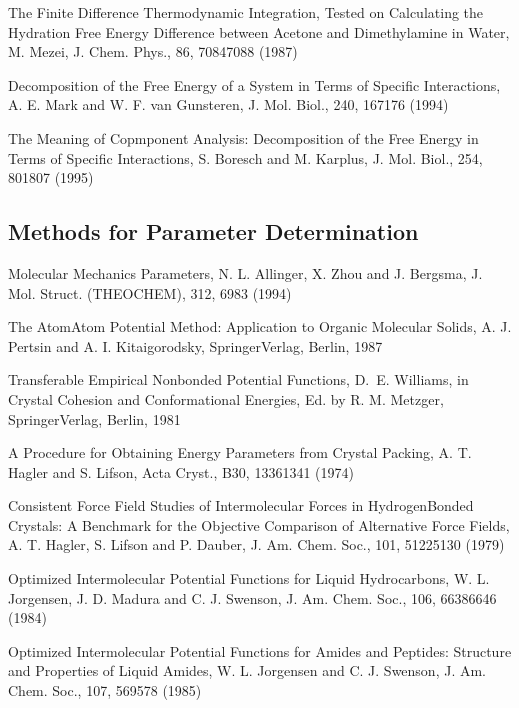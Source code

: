 \documentclass[letterpaper,11pt,english]{sphinxmanual}
\begin{document}
\sphinxAtStartPar
The Finite Difference Thermodynamic Integration, Tested on Calculating the Hydration Free Energy Difference between Acetone and Dimethylamine in Water, M. Mezei, J. Chem. Phys., 86, 7084\sphinxhyphen{}7088 (1987)

\sphinxAtStartPar
Decomposition of the Free Energy of a System in Terms of Specific Interactions, A. E. Mark and W. F. van Gunsteren, J. Mol. Biol., 240, 167\sphinxhyphen{}176 (1994)

\sphinxAtStartPar
The Meaning of Copmponent Analysis: Decomposition of the Free Energy in Terms of Specific Interactions, S. Boresch and M. Karplus, J. Mol. Biol., 254, 801\sphinxhyphen{}807 (1995)


\subsection{Methods for Parameter Determination}
\label{\detokenize{text/references:methods-for-parameter-determination}}
\sphinxAtStartPar
Molecular Mechanics Parameters, N. L. Allinger, X. Zhou and J. Bergsma, J. Mol. Struct. (THEOCHEM), 312, 69\sphinxhyphen{}83 (1994)

\sphinxAtStartPar
The Atom\sphinxhyphen{}Atom Potential Method: Application to Organic Molecular Solids, A. J. Pertsin and A. I. Kitaigorodsky, Springer\sphinxhyphen{}Verlag, Berlin, 1987

\sphinxAtStartPar
Transferable Empirical Nonbonded Potential Functions, D. E. Williams, in Crystal Cohesion and Conformational Energies, Ed. by R. M. Metzger, Springer\sphinxhyphen{}Verlag, Berlin, 1981

\sphinxAtStartPar
A Procedure for Obtaining Energy Parameters from Crystal Packing, A. T. Hagler and S. Lifson, Acta Cryst., B30, 1336\sphinxhyphen{}1341 (1974)

\sphinxAtStartPar
Consistent Force Field Studies of Intermolecular Forces in Hydrogen\sphinxhyphen{}Bonded Crystals:  A Benchmark for the Objective Comparison of Alternative Force Fields, A. T. Hagler, S. Lifson and P. Dauber, J. Am. Chem. Soc., 101, 5122\sphinxhyphen{}5130 (1979)

\sphinxAtStartPar
Optimized Intermolecular Potential Functions for Liquid Hydrocarbons, W. L. Jorgensen, J. D. Madura and C. J. Swenson, J. Am. Chem. Soc., 106, 6638\sphinxhyphen{}6646 (1984)

\sphinxAtStartPar
Optimized Intermolecular Potential Functions for Amides and Peptides: Structure and Properties of Liquid Amides, W. L. Jorgensen and C. J. Swenson, J. Am. Chem. Soc., 107, 569\sphinxhyphen{}578 (1985)
\end{document}
